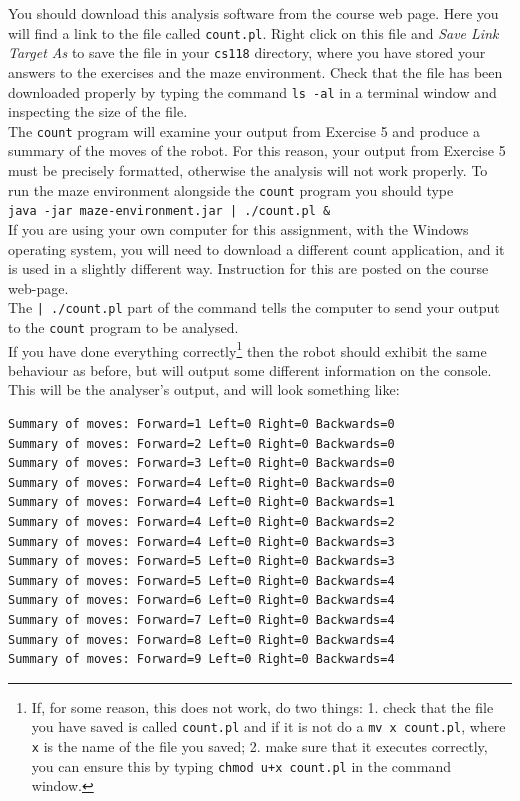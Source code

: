 \noindent
You should download this analysis software from the course web page. Here 
you will find a link to the file called {\tt count.pl}. Right click on this 
file and {\em Save Link Target As} to save the file in your {\tt cs118} 
directory, where you have stored your answers to the exercises and the 
maze environment. Check that the file has been downloaded properly by typing
the command {\tt ls -al} in a terminal window and inspecting the size 
of the file. \\

\noindent
The {\tt count} program will examine your output from Exercise 5 and produce
a summary of the moves of the robot. For this reason, your output from 
Exercise 5 must be precisely formatted, otherwise the analysis will not 
work properly. To run the maze environment alongside the {\tt count} program 
you should type \\

{\tt java -jar maze-environment.jar | ./count.pl \&}\\

\noindent
If you are using your own computer for this assignment, with the Windows operating
system, you will need to download a different count application, and it is used in a slightly 
different way. Instruction for this are posted on the course web-page.\\

\noindent
The {\tt | ./count.pl} part of the command tells the computer
to send your output to the {\tt count} program to be analysed.\\

\noindent
If you have done everything correctly\footnote{If, for some reason, this 
does not work, do two things: 1. check that the file you have saved is called
{\tt count.pl} and if it is not do a {\tt mv x count.pl}, where {\tt x} is the 
name of the file you saved; 2. make sure that it executes correctly, you 
can ensure this by typing {\tt chmod u+x count.pl} in the command window.}
then the robot
should exhibit the same behaviour as before, but will output some different
information on the console. This will be the analyser's output, and
will look something like:

\begin{verbatim}
Summary of moves: Forward=1 Left=0 Right=0 Backwards=0
Summary of moves: Forward=2 Left=0 Right=0 Backwards=0
Summary of moves: Forward=3 Left=0 Right=0 Backwards=0
Summary of moves: Forward=4 Left=0 Right=0 Backwards=0
Summary of moves: Forward=4 Left=0 Right=0 Backwards=1
Summary of moves: Forward=4 Left=0 Right=0 Backwards=2
Summary of moves: Forward=4 Left=0 Right=0 Backwards=3
Summary of moves: Forward=5 Left=0 Right=0 Backwards=3
Summary of moves: Forward=5 Left=0 Right=0 Backwards=4
Summary of moves: Forward=6 Left=0 Right=0 Backwards=4
Summary of moves: Forward=7 Left=0 Right=0 Backwards=4
Summary of moves: Forward=8 Left=0 Right=0 Backwards=4
Summary of moves: Forward=9 Left=0 Right=0 Backwards=4
\end{verbatim}

